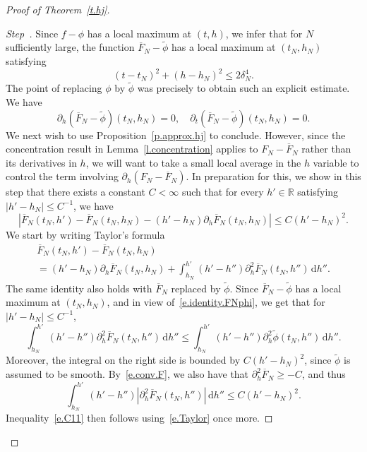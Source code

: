 \documentclass[10pt]{amsart}
\theoremstyle{definition}\newtheorem{defi}[theo]{Definition}\newtheorem{rema}[theo]{Remark}\newtheorem{exam}[theo]{Example}\newtheorem{exem}[theo]{Example}\newtheorem{nota}[theo]{Notation}
\newcommand{\R}{\mathbb{R}}
\renewcommand{\d}{\mathrm{d}}
\newcommand{\1}{\mathds{1}}
\renewcommand{\le}{\leqslant}
\renewcommand{\ge}{\geqslant}
\renewcommand{\bar}{\overline}
\newcommand{\td}{\widetilde}
\newcommand{\de}{\delta}
\newcounter{stepcount}
\newenvironment{step}{\refstepcounter{stepcount}\begin{proof}[Step~\thestepcount]}{\let\qed\relax\end{proof}}
\begin{document}
\begin{proof}[Proof of Theorem~\ref{t.hj}]
\begin{step}
Since $f-\phi$ has a local maximum at $(t,h)$, we infer that for $N$ sufficiently large, the function $\bar F_N - \td \phi$ has a local maximum at $(t_N,h_N)$ satisfying
\begin{equation}\label{e.bound.tNhN}
(t-t_N)^2 + (h-h_N)^2 \le 2 \de_N^4.
\end{equation}
The point of replacing $\phi$ by $\td \phi$ was precisely to obtain such an explicit estimate. We have
\begin{equation}\label{e.identity.FNphi}
\partial_h \left(\bar F_N - \td \phi\right)(t_N,h_N) = 0, \quad \partial_t \left(\bar F_N - \td \phi\right)(t_N,h_N) = 0.
\end{equation}
We next wish to use Proposition~\ref{p.approx.hj} to conclude. However, since the concentration result in Lemma~\ref{l.concentration} applies to $F_N - \bar F_N$ rather than its derivatives in $h$, we will want to take a small local average in the $h$ variable to control the term involving $\partial_h (F_N - \bar F_N)$. In preparation for this, we show in this step that there exists a constant $C < \infty$ such that for every $h' \in \R$ satisfying $|h'-h_N| \le C^{-1}$, we have
\begin{equation}\label{e.C11}
\left| \bar F_N(t_N,h') - \bar F_N(t_N,h_N) - (h'-h_N)\partial_h \bar F_N(t_N,h_N) \right| \le C (h'-h_N)^2.
\end{equation}
We start by writing Taylor's formula
\begin{multline}\label{e.Taylor}
\bar F_N(t_N,h') - \bar F_N(t_N,h_N)
\\
= (h'-h_N) \partial_h \bar F_N(t_N,h_N) + \int_{h_N}^{h'} (h'-h'') \partial_h^2 \bar F_N(t_N,h'') \, \d h''.
\end{multline}
The same identity also holds with $\bar F_N$ replaced by $\td \phi$. Since $\bar F_N - \td \phi$ has a local maximum at $(t_N,h_N)$, and in view of~\eqref{e.identity.FNphi}, we get that for $|h'-h_N|\le C^{-1}$,
\[
\int_{h_N}^{h'} (h'-h'') \partial_h^2 \bar F_N\left(t_N,h''\right) \, \d h'' \le \int_{h_N}^{h'} (h'-h'') \partial_h^2 \td \phi(t_N,h'') \, \d h''.
\]
Moreover, the integral on the right side is bounded by $C(h'-h_N)^2$, since $\td \phi$ is assumed to be smooth. By~\eqref{e.conv.F}, we also have that $\partial_h^2 \bar F_N \ge -C$, and thus
\[
\int_{h_N}^{h'} (h'-h'') \left|\partial_h^2 \bar F_N(t_N,h'')\right| \, \d h'' \le C (h'-h_N)^2.
\]
Inequality~\eqref{e.C11} then follows using~\eqref{e.Taylor} once more.
\end{step}


\end{proof}
\end{document}
